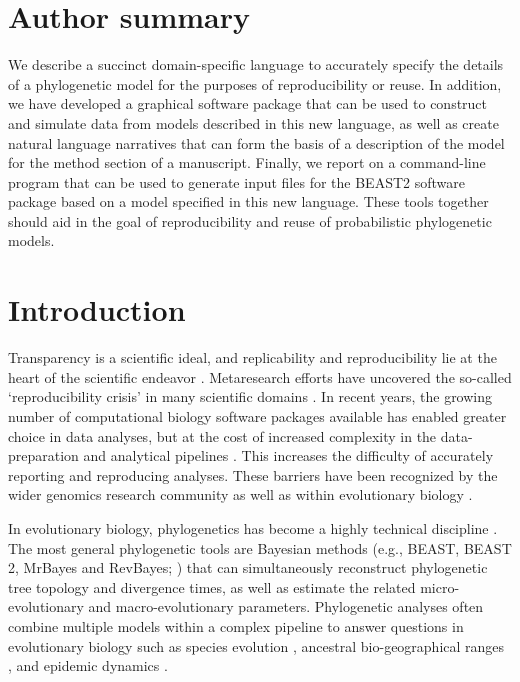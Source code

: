 \documentclass[10pt,letterpaper,table]{article}
\begin{document}
\section*{Author summary}
  We describe a succinct domain-specific language to accurately specify the details of a phylogenetic model for the purposes of reproducibility or reuse.
  In addition, we have developed a graphical software package that can be used to construct and simulate data from models described in this new language, as well as create natural language narratives that can form the basis of a description of the model for the method section of a manuscript.
  Finally, we report on a command-line program that can be used to generate input files for the BEAST2 software package based on a model specified in this new language.
  These tools together should aid in the goal of reproducibility and reuse of probabilistic phylogenetic models. 


\linenumbers

\section{Introduction}
Transparency is a scientific ideal, and replicability and
reproducibility lie at the heart of the scientific endeavor
\cite{nas19,munafo17}. 
Metaresearch efforts have uncovered the so-called `reproducibility
crisis' \cite{baker16} in many scientific domains \cite{baker16}. 
In recent years, the growing number of computational biology software packages available has enabled greater choice in data analyses, 
but at the cost of increased complexity in the data-preparation and analytical pipelines \cite{eren2021community}. 
This increases the difficulty of accurately reporting and reproducing analyses. 
These barriers have been recognized by the wider genomics research community \cite{eren2021community} as well as within evolutionary biology \cite{oakley2014osiris}. 

In evolutionary biology, phylogenetics has become a highly technical discipline \cite{oakley2014osiris}. 
The most general phylogenetic tools are Bayesian methods (e.g., BEAST, BEAST 2, MrBayes and
RevBayes; \cite{beast,beast2,revbayes,mrbayes}) 
that can simultaneously reconstruct phylogenetic tree topology and divergence times, as well as estimate the related micro-evolutionary and macro-evolutionary parameters. 
Phylogenetic analyses often combine multiple models within a complex pipeline to answer questions in evolutionary biology such as species evolution \cite{gavryushkina17,ogilvie21,zhang21}, 
ancestral bio-geographical ranges \cite{lemey10,landis18}, and epidemic dynamics \cite{faria21,douglas21}. 
\end{document}
